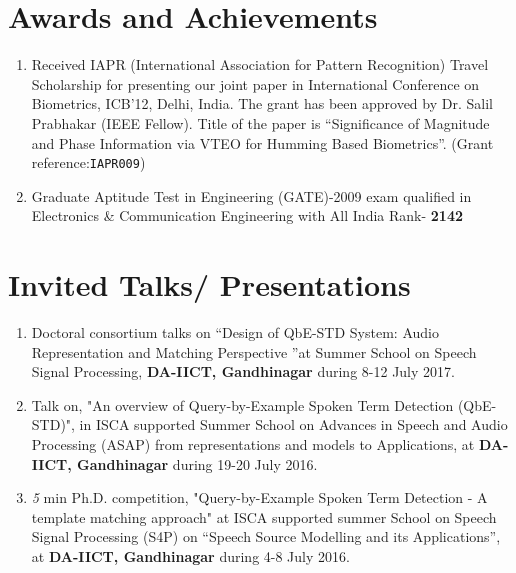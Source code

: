 \documentclass[10pt]{article}
\begin{document}
\section*{Awards and Achievements}
\begin{enumerate}
				\setlength\itemsep{0.25em}
\item Received IAPR (International Association for Pattern Recognition) Travel Scholarship for presenting our joint paper in International Conference on Biometrics, ICB'12, Delhi, India. The grant has been approved by Dr. Salil Prabhakar (IEEE Fellow).  Title of the paper is ``Significance of Magnitude and Phase Information via VTEO for Humming Based Biometrics''. (Grant reference:\verb|IAPR009|)
\item Graduate Aptitude Test in Engineering (GATE)-2009 exam qualified in Electronics \& Communication Engineering with All India Rank- \textbf{2142} 
\end{enumerate}

\section*{Invited Talks/ Presentations}
\begin{enumerate}
			\setlength\itemsep{0.25em}
\item Doctoral consortium talks on ``Design of QbE-STD System: Audio Representation and Matching Perspective ''at Summer School on Speech Signal Processing, \textbf{DA-IICT, Gandhinagar} during 8-12 July 2017.
\item Talk on, "An overview of Query-by-Example Spoken Term Detection (QbE-STD)", in ISCA supported Summer School on Advances in Speech and Audio Processing (ASAP) from representations and models to Applications, at \textbf{DA-IICT, Gandhinagar} during 19-20 July 2016.
\item \textit{5} min Ph.D. competition, "Query-by-Example Spoken Term Detection - A template matching approach" at ISCA supported summer School on Speech Signal Processing (S4P) on ``Speech Source Modelling and its Applications'', at \textbf{DA-IICT, Gandhinagar} during 4-8 July 2016.   
\end{enumerate}
\end{document}
